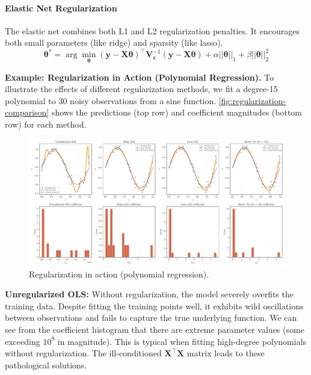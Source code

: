 \paragraph*{Elastic Net Regularization}
The elastic net combines both L1 and L2 regularization penalties. It encourages both small parameters (like ridge) and sparsity (like lasso).
\begin{equation}
    \boldsymbol{\theta}^* = \arg\min_{\boldsymbol{\theta}} (\mathbf{y} - \mathbf{X}\boldsymbol{\theta})^\top \mathbf{V}_{\boldsymbol{\epsilon}}^{-1} (\mathbf{y} - \mathbf{X}\boldsymbol{\theta}) + \alpha||\boldsymbol{\theta}||_1 + \beta||\boldsymbol{\theta}||_2^2
    \label{eq:elastic-net-regularization}
\end{equation}

\begin{exampleBox}
    \textbf{Example: Regularization in Action (Polynomial Regression).}
    To illustrate the effects of different regularization methods, we fit a degree-15 polynomial to 30 noisy observations from a sine function. \autoref{fig:regularization-comparison} shows the predictions (top row) and coefficient magnitudes (bottom row) for each method.

    \begin{figure}[H]
        \centering
        \includegraphics[width=\textwidth]{figs/models-vs-data/regularization_comparison.pdf}
        \caption{Regularization in action (polynomial regression).}
        \label{fig:regularization-comparison}
    \end{figure}
    
    \textbf{Unregularized OLS:} Without regularization, the model severely overfits the training data. Despite fitting the training points well, it exhibits wild oscillations between observations and fails to capture the true underlying function. We can see from the coefficient histogram that there are extreme parameter values (some exceeding $10^9$ in magnitude). This is typical when fitting high-degree polynomials without regularization. The ill-conditioned $\mathbf{X}^\top\mathbf{X}$ matrix leads to these pathological solutions.
    

\end{exampleBox}

